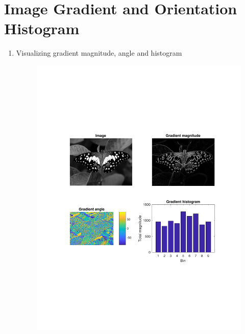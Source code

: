 \documentclass[10pt,letterpaper]{article}
\begin{document}
\section{Image Gradient and Orientation Histogram}
\begin{enumerate}
\item Visualizing gradient magnitude, angle and histogram
\begin{figure}[h]
\centering
\includegraphics[width=0.9\linewidth]{../latex/figs/butterfly-result.pdf}
\end{figure}
\newpage


\end{enumerate}
\end{document}
